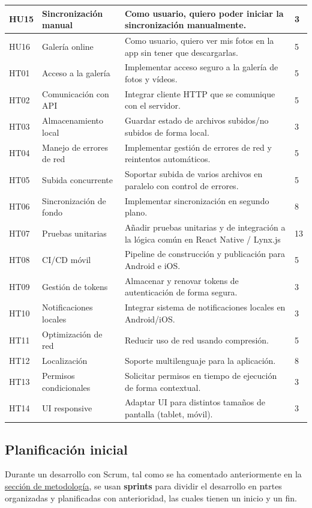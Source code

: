 \begin{tabularx}{\textwidth}{|l|l|>{\raggedright\arraybackslash}X|l|}
    \hline
    HU15 & Sincronización manual & Como usuario, quiero poder iniciar la sincronización manualmente. & 3 \\
    \hline
    HU16 & Galería online & Como usuario, quiero ver mis fotos en la app sin tener que descargarlas. & 5 \\
    \hline
    HT01 & Acceso a la galería & Implementar acceso seguro a la galería de fotos y vídeos. & 5 \\
    \hline
    HT02 & Comunicación con API & Integrar cliente HTTP que se comunique con el servidor. & 5 \\
    \hline
    HT03 & Almacenamiento local & Guardar estado de archivos subidos/no subidos de forma local. & 3 \\
    \hline
    HT04 & Manejo de errores de red & Implementar gestión de errores de red y reintentos automáticos. & 5 \\
    \hline
    HT05 & Subida concurrente & Soportar subida de varios archivos en paralelo con control de errores. & 5 \\
    \hline
    HT06 & Sincronización de fondo & Implementar sincronización en segundo plano. & 8 \\
    \hline
    HT07 & Pruebas unitarias & Añadir pruebas unitarias y de integración a la lógica común en React Native / Lynx.js & 13 \\
    \hline
    HT08 & CI/CD móvil & Pipeline de construcción y publicación para Android e iOS. & 5 \\
    \hline
    HT09 & Gestión de tokens & Almacenar y renovar tokens de autenticación de forma segura. & 3 \\
    \hline
    HT10 & Notificaciones locales & Integrar sistema de notificaciones locales en Android/iOS. & 3 \\
    \hline
    HT11 & Optimización de red & Reducir uso de red usando compresión. & 5 \\
    \hline
    HT12 & Localización & Soporte multilenguaje para la aplicación. & 8 \\
    \hline
    HT13 & Permisos condicionales & Solicitar permisos en tiempo de ejecución de forma contextual. & 3 \\
    \hline
    HT14 & UI responsive & Adaptar UI para distintos tamaños de pantalla (tablet, móvil). & 3 \\
    \hline
\end{tabularx}


\subsection{Planificación inicial}
Durante un desarrollo con Scrum, tal como se ha comentado anteriormente en la \hyperref[sec:metodologia]{sección de metodología}, se usan \textbf{sprints} para dividir el desarrollo en partes organizadas y planificadas con anterioridad, las cuales tienen un inicio y un fin.

